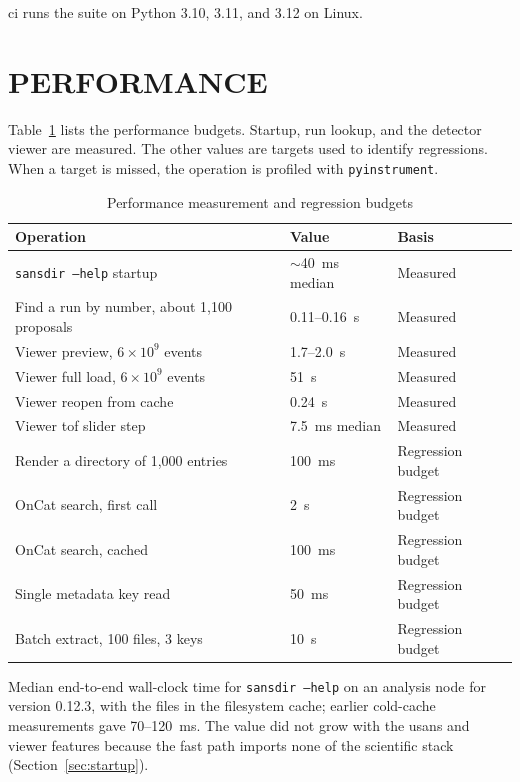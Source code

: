 \documentclass[tm]{ornltm}
\begin{document}
\Ac{ci} runs the suite on Python 3.10, 3.11, and 3.12 on Linux.

\section{PERFORMANCE}
\label{sec:perf}

Table~\ref{tab:perf} lists the performance budgets. Startup, run lookup, and the
detector viewer are measured. The other values are targets used to identify
regressions. When a target is missed,
the operation is profiled with \texttt{pyinstrument}.

\begin{table}[ht]
  \centering
  \begin{threeparttable}
  \caption{Performance measurement and regression budgets}
  \label{tab:perf}
  \small
  \begin{tabular}{p{} l l}
    \toprule
    Operation & Value & Basis \\
    \midrule
    \texttt{sansdir --help} startup & $\sim$40~ms median\tnote{a} & Measured \\
    Find a run by number, about 1,100 proposals & 0.11--0.16~s & Measured \\
    Viewer preview, $6\times10^{9}$ events & 1.7--2.0~s & Measured \\
    Viewer full load, $6\times10^{9}$ events & 51~s & Measured \\
    Viewer reopen from cache & 0.24~s & Measured \\
    Viewer \ac{tof} slider step & 7.5~ms median & Measured \\
    Render a directory of 1,000 entries & 100~ms & Regression budget \\
    OnCat search, first call & 2~s & Regression budget \\
    OnCat search, cached & 100~ms & Regression budget \\
    Single metadata key read & 50~ms & Regression budget \\
    Batch extract, 100 files, 3 keys & 10~s & Regression budget \\
    \bottomrule
  \end{tabular}
  \begin{tablenotes}
    \item[a] Median end-to-end wall-clock time for \texttt{sansdir --help} on
    an analysis node for version 0.12.3, with the files in the filesystem
    cache; earlier cold-cache measurements gave 70--120~ms. The value did not
    grow with the \ac{usans} and viewer features because the fast path imports
    none of the scientific stack (Section~\ref{sec:startup}).
  \end{tablenotes}
  \end{threeparttable}
\end{table}
\end{document}
